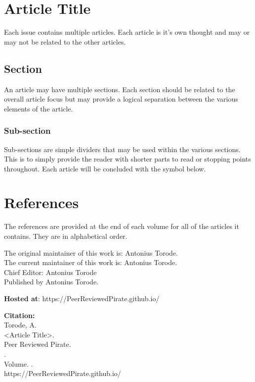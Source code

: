 \begin{framed}[.5\textwidth]
	\begin{minipage}{\linewidth}
		\section*{Article Title}
		Each issue contains multiple articles. Each article is it's own thought and may or may not be related to the other articles.
		
		\hspace{1em}\subsection*{Section}
		
		An article may have multiple sections. Each section should be related to the overall article focus but may provide a logical separation between the various elements of the article.
		
		\hspace{1em}\subsubsection*{Sub-section}
		
		Sub-sections are simple dividers that may be used within the various sections. This is to simply provide the reader with shorter parts to read or stopping points throughout. Each article will be concluded with the symbol below.
		
		\sectionEnd
		
		\section*{References}
		The references are provided at the end of each volume for all of the articles it contains. They are in alphabetical order.
	\end{minipage}
\end{framed}


	\vspace{1cm}
		
	The original maintainer of this work is: Antonius Torode. \\		
	The current maintainer of this work is: Antonius Torode. \\
	Chief Editor: Antonius Torode\\		 		
	Published by Antonius Torode. 
	
	\textbf{Hosted at}: https://PeerReviewedPirate.github.io/
	
	
	\vfill
	
	\textbf{Citation:} \\
	\hspace*{2em} Torode, A.\\
	\hspace*{2em} <Article Title>. \\
	\hspace*{2em} Peer Reviewed Pirate. \\
	\hspace*{2em} \DateToUse. \\
	\hspace*{2em} Volume. \Version. \\
	\hspace*{2em} https://PeerReviewedPirate.github.io/
	
	\endgroup
	\clearpage
\twocolumn